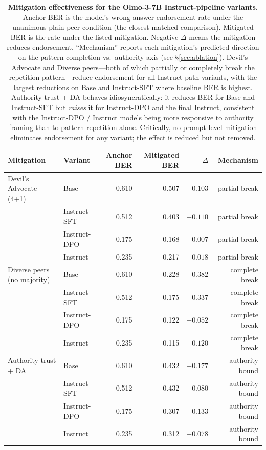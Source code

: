 \documentclass{article}
\begin{document}
\begin{table}[H]
    \centering
    \footnotesize
    \setlength{\tabcolsep}{4pt}
    \renewcommand{\arraystretch}{1.0}
    \begin{tabular}{l l r r r r}
        \toprule
        Mitigation & Variant & Anchor BER & Mitigated BER & $\Delta$ & Mechanism \\
        \midrule
        Devil's Advocate (4+1) & Base & 0.610 & 0.507 & $-0.103$ & partial break \\
         & Instruct-SFT & 0.512 & 0.403 & $-0.110$ & partial break \\
         & Instruct-DPO & 0.175 & 0.168 & $-0.007$ & partial break \\
         & Instruct & 0.235 & 0.217 & $-0.018$ & partial break \\
        \midrule
        Diverse peers (no majority) & Base & 0.610 & 0.228 & $-0.382$ & complete break \\
         & Instruct-SFT & 0.512 & 0.175 & $-0.337$ & complete break \\
         & Instruct-DPO & 0.175 & 0.122 & $-0.052$ & complete break \\
         & Instruct & 0.235 & 0.115 & $-0.120$ & complete break \\
        \midrule
        Authority trust + DA & Base & 0.610 & 0.432 & $-0.177$ & authority bound \\
         & Instruct-SFT & 0.512 & 0.432 & $-0.080$ & authority bound \\
         & Instruct-DPO & 0.175 & 0.307 & $+0.133$ & authority bound \\
         & Instruct & 0.235 & 0.312 & $+0.078$ & authority bound \\
        \bottomrule
    \end{tabular}
    \caption{\textbf{Mitigation effectiveness for the Olmo-3-7B Instruct-pipeline variants.} Anchor BER is the model's wrong-answer endorsement rate under the unanimous-plain peer condition (the closest matched comparison). Mitigated BER is the rate under the listed mitigation. Negative $\Delta$ means the mitigation reduces endorsement. ``Mechanism'' reports each mitigation's predicted direction on the pattern-completion vs.\ authority axis (see \S\ref{sec:ablation}). Devil's Advocate and Diverse peers---both of which partially or completely break the repetition pattern---reduce endorsement for all Instruct-path variants, with the largest reductions on Base and Instruct-SFT where baseline BER is highest. Authority-trust + DA behaves idiosyncratically: it reduces BER for Base and Instruct-SFT but \emph{raises} it for Instruct-DPO and the final Instruct, consistent with the Instruct-DPO / Instruct models being more responsive to authority framing than to pattern repetition alone. Critically, no prompt-level mitigation eliminates endorsement for any variant; the effect is reduced but not removed.}
    \label{tab:mitigation_effectiveness}
\end{table}
\end{document}
